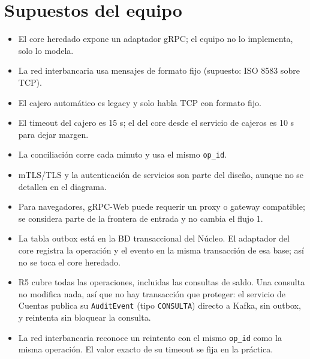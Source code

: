 \documentclass[11pt,a4paper]{article}
\begin{document}
\section{Supuestos del equipo}
\begin{itemize}
  \item El core heredado expone un adaptador gRPC; el equipo no lo implementa, solo lo modela.
  \item La red interbancaria usa mensajes de formato fijo (supuesto: ISO 8583 sobre TCP).
  \item El cajero automático es legacy y solo habla TCP con formato fijo.
  \item El timeout del cajero es 15 s; el del core desde el servicio de cajeros es 10 s para
        dejar margen.
  \item La conciliación corre cada minuto y usa el mismo \texttt{op\_id}.
  \item mTLS/TLS y la autenticación de servicios son parte del diseño, aunque no se detallen en
        el diagrama.
  \item Para navegadores, gRPC-Web puede requerir un proxy o gateway compatible; se considera
        parte de la frontera de entrada y no cambia el flujo 1.
  \item La tabla outbox está en la BD transaccional del Núcleo. El adaptador del core registra la
        operación y el evento en la misma transacción de esa base; así no se toca el core
        heredado.
  \item R5 cubre todas las operaciones, incluidas las consultas de saldo. Una consulta no
        modifica nada, así que no hay transacción que proteger: el servicio de Cuentas publica
        su \texttt{AuditEvent} (tipo \texttt{CONSULTA}) directo a Kafka, sin outbox, y reintenta
        sin bloquear la consulta.
  \item La red interbancaria reconoce un reintento con el mismo \texttt{op\_id} como la misma
        operación. El valor exacto de su timeout se fija en la práctica.
\end{itemize}

\end{document}

